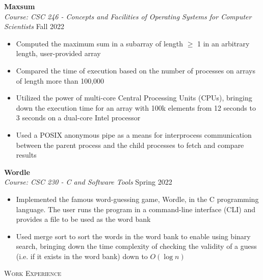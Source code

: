 \documentclass[a4paper]{article}
\newcommand{\lineunder} {
    \vspace*{-8pt} \\
    \hspace*{-18pt} \hrulefill \\
}
\newcommand{\header} [1] {
    {\hspace*{-18pt}\vspace*{6pt} \textsc{#1}}
    \vspace*{-6pt} \lineunder
}
\begin{document}
\textbf{Maxsum} \hfill \\
\textit{Course: CSC 246 - Concepts and Facilities of Operating Systems for Computer Scientists} \hfill Fall 2022\\
\vspace{-1mm}
\begin{itemize} \itemsep 1pt
	\item Computed the maximum sum in a subarray of length $\ge$ 1 in an arbitrary length, user-provided array
	\item Compared the time of execution based on the number of processes on arrays of length more than 100,000
	\item Utilized the power of multi-core Central Processing Units (CPUs), bringing down the execution time for an array with 100k elements from 12 seconds to 3 seconds on a dual-core Intel processor
    \item Used a POSIX anonymous pipe as a means for interprocess communication between the parent process and the child processes to fetch and compare results\end{itemize}
\textbf{Wordle} \hfill \\
\textit{Course: CSC 230 - C and Software Tools} \hfill Spring 2022\\
\vspace{-1mm}
\begin{itemize} \itemsep 1pt
	\item Implemented the famous word-guessing game, Wordle, in the C programming language. The user runs the program in a command-line interface (CLI) and provides a file to be used as the word bank
	\item Used merge sort to sort the words in the word bank to enable using binary search, bringing down the time complexity of checking the validity of a guess (i.e. if it exists in the word bank) down to $O(\log{}n)$
\end{itemize}


\header{Work Experience}
\vspace{1mm}
\end{document}
